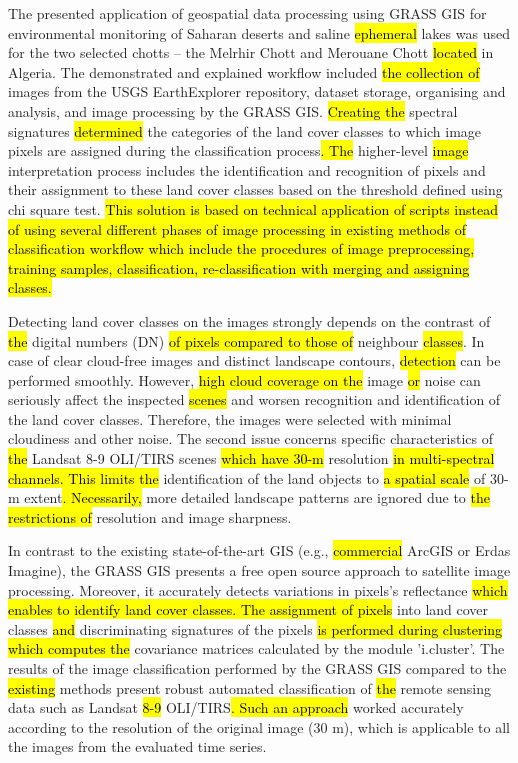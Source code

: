 \documentclass[asi,article,submit,pdftex,moreauthors]{Definitions/mdpi}
\begin{document}
The presented application of geospatial data processing using\hl{ }GRASS GIS for environmental monitoring of Saharan deserts and saline \hl{ephemeral }lakes was used for the two selected chotts -- the Melrhir Chott and Merouane Chott \hl{located }in Algeria. The demonstrated and explained workflow included \hl{the collection of }images from the USGS EarthExplorer repository, dataset storage, organising and analysis, and image processing by the GRASS GIS.\hl{ Creating the }spectral signatures\hl{ determined} the categories of the land cover classes to which image pixels are assigned during the classification process\hl{. The }higher-level \hl{image }interpretation process includes the identification and recognition of pixels and their assignment to these land cover classes based on the threshold defined using chi square test. \hl{This solution is based on technical application of scripts instead of using several different phases of image processing in existing methods of classification workflow which include the procedures of image preprocessing, training samples, classification, re-classification with merging and assigning classes.}

Detecting land cover classes on the images strongly depends on the contrast of \hl{the} digital numbers (DN) \hl{of pixels compared to those of }neighbour \hl{classes}. In case of clear cloud-free images and distinct landscape contours, \hl{detection} can be performed smoothly. However, \hl{high cloud coverage on the }image\hl{ or }noise can seriously affect the inspected \hl{scenes} and worsen recognition and identification of the land cover classes. Therefore, the images were selected with minimal cloudiness and other noise. The second issue concerns specific characteristics of \hl{the }Landsat 8-9 OLI/TIRS scenes \hl{which have 30-m} resolution \hl{in multi-spectral channels. This limits the }identification of the land objects\hl{ }to \hl{a spatial scale} of 30-m extent\hl{. Necessarily, }more detailed landscape patterns are ignored due to \hl{the restrictions of }resolution and image sharpness. 

In contrast to the existing state-of-the-art\hl{ }GIS (e.g., \hl{commercial }ArcGIS or Erdas Imagine), the GRASS GIS presents a free open source approach to satellite image processing. Moreover, it accurately detects variations in pixels's reflectance \hl{which enables to identify land cover classes. The assignment of pixels} into land cover classes \hl{and} discriminating signatures of the pixels \hl{is performed during clustering which computes the }covariance matrices calculated\hl{ }by the\hl{ }module 'i.cluster'. The results of the image classification performed by the GRASS GIS compared to the \hl{existing} methods present robust automated classification of \hl{the }remote sensing data such as Landsat \hl{8-9 }OLI/TIRS\hl{. Such an approach} worked accurately according to the resolution of the original image (30 m), which is applicable to all the images from the evaluated time series. 
\end{document}
